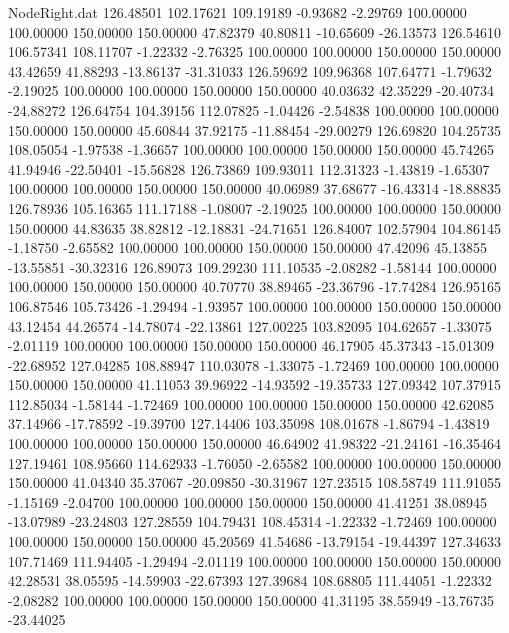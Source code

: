 \begin{filecontents}{NodeRight.dat}
 126.48501  102.17621  109.19189    -0.93682   -2.29769  100.00000  100.00000  150.00000  150.00000   47.82379   40.80811  -10.65609  -26.13573
 126.54610  106.57341  108.11707    -1.22332   -2.76325  100.00000  100.00000  150.00000  150.00000   43.42659   41.88293  -13.86137  -31.31033
 126.59692  109.96368  107.64771    -1.79632   -2.19025  100.00000  100.00000  150.00000  150.00000   40.03632   42.35229  -20.40734  -24.88272
 126.64754  104.39156  112.07825    -1.04426   -2.54838  100.00000  100.00000  150.00000  150.00000   45.60844   37.92175  -11.88454  -29.00279
 126.69820  104.25735  108.05054    -1.97538   -1.36657  100.00000  100.00000  150.00000  150.00000   45.74265   41.94946  -22.50401  -15.56828
 126.73869  109.93011  112.31323    -1.43819   -1.65307  100.00000  100.00000  150.00000  150.00000   40.06989   37.68677  -16.43314  -18.88835
 126.78936  105.16365  111.17188    -1.08007   -2.19025  100.00000  100.00000  150.00000  150.00000   44.83635   38.82812  -12.18831  -24.71651
 126.84007  102.57904  104.86145    -1.18750   -2.65582  100.00000  100.00000  150.00000  150.00000   47.42096   45.13855  -13.55851  -30.32316
 126.89073  109.29230  111.10535    -2.08282   -1.58144  100.00000  100.00000  150.00000  150.00000   40.70770   38.89465  -23.36796  -17.74284
 126.95165  106.87546  105.73426    -1.29494   -1.93957  100.00000  100.00000  150.00000  150.00000   43.12454   44.26574  -14.78074  -22.13861
 127.00225  103.82095  104.62657    -1.33075   -2.01119  100.00000  100.00000  150.00000  150.00000   46.17905   45.37343  -15.01309  -22.68952
 127.04285  108.88947  110.03078    -1.33075   -1.72469  100.00000  100.00000  150.00000  150.00000   41.11053   39.96922  -14.93592  -19.35733
 127.09342  107.37915  112.85034    -1.58144   -1.72469  100.00000  100.00000  150.00000  150.00000   42.62085   37.14966  -17.78592  -19.39700
 127.14406  103.35098  108.01678    -1.86794   -1.43819  100.00000  100.00000  150.00000  150.00000   46.64902   41.98322  -21.24161  -16.35464
 127.19461  108.95660  114.62933    -1.76050   -2.65582  100.00000  100.00000  150.00000  150.00000   41.04340   35.37067  -20.09850  -30.31967
 127.23515  108.58749  111.91055    -1.15169   -2.04700  100.00000  100.00000  150.00000  150.00000   41.41251   38.08945  -13.07989  -23.24803
 127.28559  104.79431  108.45314    -1.22332   -1.72469  100.00000  100.00000  150.00000  150.00000   45.20569   41.54686  -13.79154  -19.44397
 127.34633  107.71469  111.94405    -1.29494   -2.01119  100.00000  100.00000  150.00000  150.00000   42.28531   38.05595  -14.59903  -22.67393
 127.39684  108.68805  111.44051    -1.22332   -2.08282  100.00000  100.00000  150.00000  150.00000   41.31195   38.55949  -13.76735  -23.44025

\end{filecontents}
